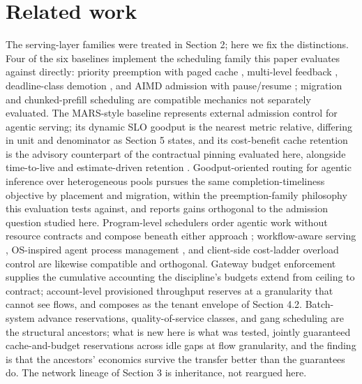 \section{Related work}

The serving-layer families were treated in Section 2; here we fix the
distinctions. Four of the six baselines implement the scheduling family
this paper evaluates against directly: priority preemption with paged
cache \citep{vllm2023}, multi-level feedback \citep{wu2023fastserve},
deadline-class demotion \citep{niyama2025}, and AIMD admission with
pause/resume \citep{concur2026}; migration and chunked-prefill scheduling
\citep{llumnix2024,sarathi2024} are compatible mechanics not separately
evaluated. The MARS-style baseline \citep{mars2026} represents external
admission control for agentic serving; its dynamic SLO goodput is the
nearest metric relative, differing in unit and denominator as Section 5
states, and its cost-benefit cache retention is the advisory
counterpart of the contractual pinning evaluated here, alongside
time-to-live and estimate-driven retention \citep{continuum2025,infercept2024}. Goodput-oriented routing for agentic inference over
heterogeneous pools \citep{goodserve2026} pursues the same
completion-timeliness objective by placement and migration, within the
preemption-family philosophy this evaluation tests against, and reports
gains orthogonal to the admission question studied here. Program-level
schedulers order agentic work without resource contracts and compose
beneath either approach \citep{autellix2025}; workflow-aware serving
\citep{helium2026}, OS-inspired agent process management \citep{hivemind2026}, and
client-side cost-ladder overload control \citep{unschedulable2026} are
likewise compatible and orthogonal. Gateway budget enforcement
\citep{litellm2026,truefoundry2026} supplies the cumulative accounting the
discipline's budgets extend from ceiling to contract; account-level
provisioned throughput \citep{bedrock_ptu,azure_ptu} reserves at a
granularity that cannot see flows, and composes as the tenant envelope
of Section 4.2. Batch-system advance reservations, quality-of-service
classes, and gang scheduling \citep{slurm_reservations,k8s_qos,gang_scheduling} are the structural ancestors; what is new here is what
was tested, jointly guaranteed cache-and-budget reservations across
idle gaps at flow granularity, and the finding is that the ancestors'
economics survive the transfer better than the guarantees do. The
network lineage of Section 3 \citep{rfc2205,rfc2475,floyd1993red,rfc2597,rfc2827,rfc3704,ipmi_spec} is inheritance, not reargued here.

